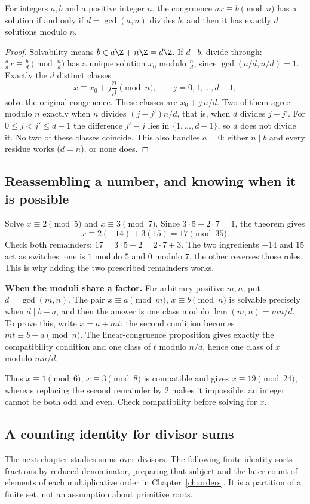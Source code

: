 \begin{proposition}\label{prop:lincong}
For integers $a,b$ and a positive integer $n$, the congruence
$ax\equiv b\pmod n$ has a solution if and only if $d=\gcd(a,n)$ divides $b$, and then it has exactly $d$ solutions modulo $n$.
\end{proposition}
\begin{proof}
Solvability means $b\in a\Z+n\Z=d\Z$. If $d\mid b$, divide through: $\frac adx\equiv\frac bd\pmod{\frac nd}$ has a unique solution $x_0$ modulo $\frac nd$, since $\gcd(a/d,n/d)=1$. Exactly the $d$ distinct classes
\[
x\equiv x_0+j\frac nd\pmod n,\qquad j=0,1,\ldots,d-1,
\]
solve the original congruence. These classes are $x_0+j\,n/d$. Two of them agree modulo $n$ exactly when $n$ divides $(j-j')n/d$, that is, when $d$ divides $j-j'$. For $0\le j<j'\le d-1$ the difference $j'-j$ lies in $\{1,\ldots,d-1\}$, so $d$ does not divide it. No two of these classes coincide. This also handles $a=0$: either $n\mid b$ and every residue works ($d=n$), or none does.
\end{proof}

\subsection*{Reassembling a number, and knowing when it is possible}
Solve $x\equiv2\pmod5$ and $x\equiv3\pmod7$. Since $3\cdot5-2\cdot7=1$, the theorem gives
\[
x\equiv2(-14)+3(15)=17\pmod{35}.
\]
Check both remainders: $17=3\cdot5+2=2\cdot7+3$. The two ingredients $-14$ and $15$ act as switches: one is $1$ modulo $5$ and $0$ modulo $7$, the other reverses those roles. This is why adding the two prescribed remainders works.

\textbf{When the moduli share a factor.} For arbitrary positive $m,n$, put $d=\gcd(m,n)$. The pair $x\equiv a\pmod m$, $x\equiv b\pmod n$ is solvable precisely when $d\mid b-a$, and then the answer is one class modulo $\operatorname{lcm}(m,n)=mn/d$. To prove this, write $x=a+mt$: the second condition becomes $mt\equiv b-a\pmod n$. The linear-congruence proposition gives exactly the compatibility condition and one class of $t$ modulo $n/d$, hence one class of $x$ modulo $mn/d$.

Thus $x\equiv1\pmod6$, $x\equiv3\pmod8$ is compatible and gives $x\equiv19\pmod{24}$, whereas replacing the second remainder by $2$ makes it impossible: an integer cannot be both odd and even. Check compatibility before solving for $x$.

\subsection*{A counting identity for divisor sums}
The next chapter studies sums over divisors. The following finite identity sorts fractions by reduced denominator, preparing that subject and the later count of elements of each multiplicative order in Chapter~\ref{ch:orders}. It is a partition of a finite set, not an assumption about primitive roots.

